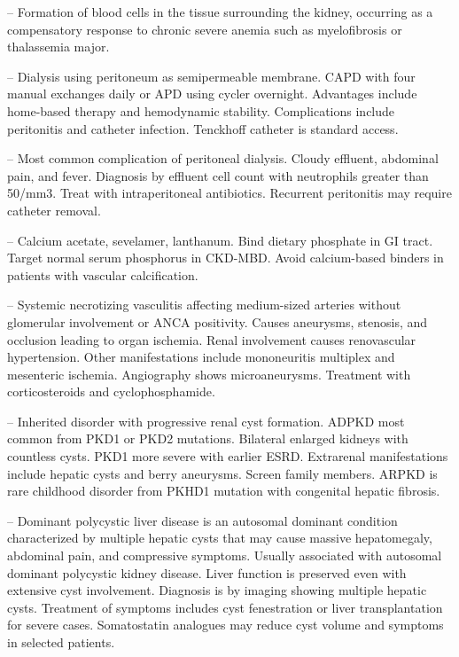 -- Formation of blood cells in the tissue surrounding the kidney, occurring as a compensatory response to chronic severe anemia such as myelofibrosis or thalassemia major.

-- Dialysis using peritoneum as semipermeable membrane. CAPD with four manual exchanges daily or APD using cycler overnight. Advantages include home-based therapy and hemodynamic stability. Complications include peritonitis and catheter infection. Tenckhoff catheter is standard access.

-- Most common complication of peritoneal dialysis. Cloudy effluent, abdominal pain, and fever. Diagnosis by effluent cell count with neutrophils greater than 50/mm3. Treat with intraperitoneal antibiotics. Recurrent peritonitis may require catheter removal.

-- Calcium acetate, sevelamer, lanthanum. Bind dietary phosphate in GI tract. Target normal serum phosphorus in CKD-MBD. Avoid calcium-based binders in patients with vascular calcification.

-- Systemic necrotizing vasculitis affecting medium-sized arteries without glomerular involvement or ANCA positivity. Causes aneurysms, stenosis, and occlusion leading to organ ischemia. Renal involvement causes renovascular hypertension. Other manifestations include mononeuritis multiplex and mesenteric ischemia. Angiography shows microaneurysms. Treatment with corticosteroids and cyclophosphamide.

-- Inherited disorder with progressive renal cyst formation. ADPKD most common from PKD1 or PKD2 mutations. Bilateral enlarged kidneys with countless cysts. PKD1 more severe with earlier ESRD. Extrarenal manifestations include hepatic cysts and berry aneurysms. Screen family members. ARPKD is rare childhood disorder from PKHD1 mutation with congenital hepatic fibrosis.

-- Dominant polycystic liver disease is an autosomal dominant condition characterized by multiple hepatic cysts that may cause massive hepatomegaly, abdominal pain, and compressive symptoms. Usually associated with autosomal dominant polycystic kidney disease. Liver function is preserved even with extensive cyst involvement. Diagnosis is by imaging showing multiple hepatic cysts. Treatment of symptoms includes cyst fenestration or liver transplantation for severe cases. Somatostatin analogues may reduce cyst volume and symptoms in selected patients.

